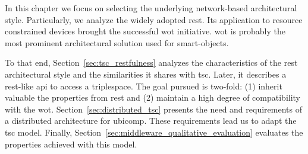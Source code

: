 In this chapter we focus on selecting the underlying network-based architectural style.
Particularly, we analyze the widely adopted \acf{rest}.
Its application to resource constrained devices brought the successful \ac{wot} initiative.
\ac{wot} is probably the most prominent architectural solution used for smart-objects. %


To that end, Section~\ref{sec:tsc_restfulness} analyzes the characteristics of the \ac{rest} architectural style and the similarities it shares with \ac{tsc}.
Later, it describes a \ac{rest}-like \ac{api} to access a triplespace. %
The goal pursued is two-fold: (1) inherit valuable the properties from \ac{rest} and (2) maintain a high degree of compatibility with the \ac{wot}.
Section~\ref{sec:distributed_tsc} presents the need and requirements of a distributed architecture for \ac{ubicomp}.
These requirements lead us to adapt the \ac{tsc} model.
Finally, Section~\ref{sec:middleware_qualitative_evaluation} evaluates the properties achieved with this model.








%
%
%